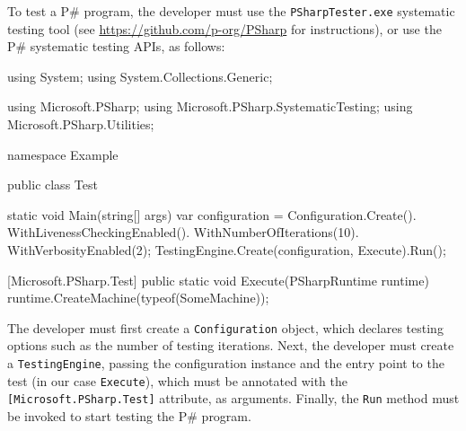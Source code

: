 \documentclass{llncs}
\newcommand{\ps}{P\#\xspace}
\begin{document}
To test a \ps program, the developer must use the \texttt{PSharpTester.exe} systematic testing tool (see \textcolor{blue}{\url{https://github.com/p-org/PSharp}} for instructions), or use the \ps systematic testing APIs, as follows:

\begin{psharp}
using System;
using System.Collections.Generic;

using Microsoft.PSharp;
using Microsoft.PSharp.SystematicTesting;
using Microsoft.PSharp.Utilities;

namespace Example
{
    public class Test
    {
        static void Main(string[] args)
        {
            var configuration = Configuration.Create().
                WithLivenessCheckingEnabled().
                WithNumberOfIterations(10).
                WithVerbosityEnabled(2);
            TestingEngine.Create(configuration, Execute).Run();
        }

        [Microsoft.PSharp.Test]
        public static void Execute(PSharpRuntime runtime)
        {
            runtime.CreateMachine(typeof(SomeMachine));
        }
    }
}
\end{psharp}

The developer must first create a \texttt{Configuration} object, which declares testing options such as the number of testing iterations. Next, the developer must create a \texttt{TestingEngine}, passing the configuration instance and the entry point to the test (in our case \texttt{Execute}), which must be annotated with the \texttt{[Microsoft.PSharp.Test]} attribute, as arguments. Finally, the \texttt{Run} method must be invoked to start testing the \ps program.




\end{document}
